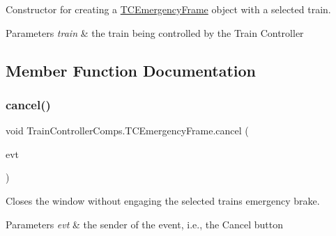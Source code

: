 Constructor for creating a \hyperlink{classTrainControllerComps_1_1TCEmergencyFrame}{T\+C\+Emergency\+Frame} object with a selected train. 


\begin{DoxyParams}{Parameters}
{\em train} & the train being controlled by the Train Controller \\
\hline
\end{DoxyParams}


\subsection{Member Function Documentation}
\mbox{\label{classTrainControllerComps_1_1TCEmergencyFrame_a657c1dcd129d412134610a08c8d3cdfd}} 
\subsubsection{\texorpdfstring{cancel()}{cancel()}}
{\footnotesize\ttfamily void Train\+Controller\+Comps.\+T\+C\+Emergency\+Frame.\+cancel (\begin{DoxyParamCaption}\item[{java.\+awt.\+event.\+Action\+Event}]{evt }\end{DoxyParamCaption})\hspace{0.3cm}{\ttfamily [private]}}



Closes the window without engaging the selected train\textquotesingle{}s emergency brake. 


\begin{DoxyParams}{Parameters}
{\em evt} & the sender of the event, i.\+e., the \textquotesingle{}Cancel\textquotesingle{} button \\
\hline
\end{DoxyParams}
\mbox{\label{classTrainControllerComps_1_1TCEmergencyFrame_aa5cf83696387c257f09ff198718eaf33}} 
